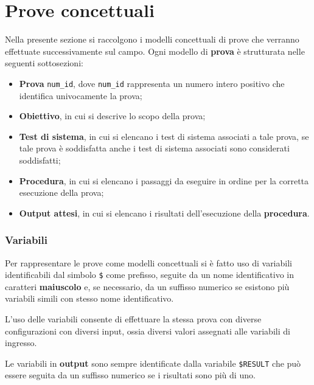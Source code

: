 \documentclass[../Sperimentazione.tex]{subfiles}
\begin{document}
	
\section{Prove concettuali}
	Nella presente sezione si raccolgono i modelli concettuali di prove che verranno effettuate successivamente sul campo. Ogni modello di \textbf{prova} è strutturata nelle seguenti sottosezioni:
	\begin{itemize}
		\item \textbf{Prova} \verb|num_id|, dove \verb|num_id| rappresenta un numero intero positivo che identifica univocamente la prova;
		\item \textbf{Obiettivo}, in cui si descrive lo scopo della prova;
		\item \textbf{Test di sistema}, in cui si elencano i test di sistema associati a tale prova, se tale prova è soddisfatta anche i test di sistema associati sono considerati soddisfatti;
		\item \textbf{Procedura}, in cui si elencano i passaggi da eseguire in ordine per la corretta esecuzione della prova;
		\item \textbf{Output attesi}, in cui si elencano i risultati dell'esecuzione della \textbf{procedura}.
	\end{itemize}
	
\subsubsection{Variabili}
	Per rappresentare le prove come modelli concettuali si è fatto uso di variabili identificabili dal simbolo \verb|$| come prefisso, seguite da un nome identificativo in caratteri \textbf{maiuscolo} e, se necessario, da un suffisso numerico se esistono più variabili simili con stesso nome identificativo.

	L'uso delle variabili consente di effettuare la stessa prova con diverse configurazioni con diversi input, ossia diversi valori assegnati alle variabili di ingresso.
	
	Le variabili in \textbf{output} sono sempre identificate dalla variabile \verb|$RESULT| che può essere seguita da un suffisso numerico se i risultati sono più di uno.
	
\end{document}
